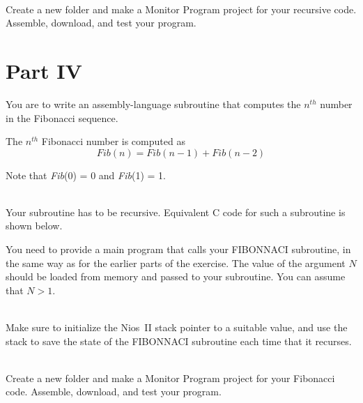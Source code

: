 \documentclass[epsfig,10pt,fullpage]{article}
\newcommand{\CommonDocsPath}{../../../../common/docs}
\begin{document}
~\\
Create a new folder and make a Monitor Program project for your recursive code.
Assemble, download, and test your program.

\section*{Part IV}
You are to write an assembly-language subroutine that computes the $n^{th}$ number in 
the Fibonacci sequence.  

 The $n^{th}$ Fibonacci number is computed as 
$$
Fib(n) = Fib(n - 1) + Fib(n - 2)
$$

Note that {\it Fib}(0) = 0 and {\it Fib}(1) = 1.

~\\
Your subroutine has to be recursive. Equivalent C code for such a subroutine is shown below. 



You need to provide a main program that calls your FIBONNACI subroutine, in the same way as for
the earlier parts of the exercise. The value of the argument $N$ should be loaded from 
memory and passed to your subroutine.  You can assume that $N > 1$.

~\\
Make sure to initialize the Nios~II stack pointer to 
a suitable value, and use the stack to save the state of the FIBONNACI subroutine each 
time that it recurses.

~\\
Create a new folder and make a Monitor Program project for your Fibonacci code.
Assemble, download, and test your program.



\end{document}
